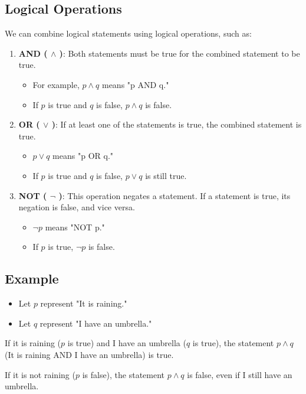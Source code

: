 \subsection{Logical Operations}
We can combine logical statements using logical operations, such as:
\begin{enumerate}
    \item \textbf{AND ( \(\land\) )}: Both statements must be true for the combined statement to be true.
    \begin{itemize}
        \item For example, \( p \land q \) means "p AND q."
        \item If \( p \) is true and \( q \) is false, \( p \land q \) is false.
    \end{itemize}
    \item \textbf{OR ( \(\lor\) )}: If at least one of the statements is true, the combined statement is true.
    \begin{itemize}
        \item \( p \lor q \) means "p OR q."
        \item If \( p \) is true and \( q \) is false, \( p \lor q \) is still true.
    \end{itemize}
    \item \textbf{NOT ( \(\neg\) )}: This operation negates a statement. If a statement is true, its negation is false, and vice versa.
    \begin{itemize}
        \item \( \neg p \) means "NOT p."
        \item If \( p \) is true, \( \neg p \) is false.
    \end{itemize}
\end{enumerate}

\subsection{Example}
\begin{itemize}
    \item Let \( p \) represent "It is raining."
    \item Let \( q \) represent "I have an umbrella."
\end{itemize}
If it is raining (\( p \) is true) and I have an umbrella (\( q \) is true), the statement \( p \land q \) (It is raining AND I have an umbrella) is true.

If it is not raining (\( p \) is false), the statement \( p \land q \) is false, even if I still have an umbrella.

